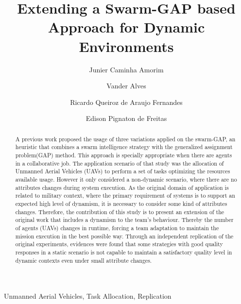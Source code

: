 \documentclass[review]{elsarticle}
\newcommand{\uavs}{UAVs}
\begin{document}
\begin{frontmatter}
	
\title{Extending a Swarm-GAP based Approach for Dynamic Environments}

\author[unbaddress]{Junier Caminha Amorim}

\author[unbaddress]{Vander Alves}

\author[brazilianarmyaddress]{Ricardo Queiroz de Araujo Fernandes}

\author[ufrgsaddress]{Edison Pignaton de Freitas}

\address[unbaddress]{Computation Science Department University of Brasilia, Brazil}
\address[ufrgsaddress]{Institute of Informatics Federal University of Rio Grande do Sul, Brazil}
\address[brazilianarmyaddress]{Software Development Center - Brazilian Army, Brazil}

\begin{abstract}
A previous work proposed the usage of three variations applied on the swarm-GAP, an heuristic that combines a swarm intelligence strategy with the generalized assignment problem(GAP) method. This approach is specially appropriate when there are agents in a collaborative job. The application scenario of that study was the allocation of Unmanned Aerial Vehicles (\uavs) to perform a set of tasks optimizing the resources available usage. However it only considered a non-dynamic scenario, where there are no attributes changes during system execution. As the original domain of application is related to military context, where the primary requirement of systems is to support an expected high level of dynamism, it is necessary to consider some kind of attributes changes. Therefore, the contribution of this study is to present an extension of the original work that includes a dynamism to the team's behaviour. Thereby the number of agents (\uavs) changes in runtime, forcing a team adaptation to maintain the mission execution in the best possible way. Through an independent replication of the original experiments, evidences were found that some strategies with good quality responses in a static scenario is not capable to maintain a satisfactory quality level in dynamic contexts even under small attribute changes. 
\end{abstract}

\begin{keyword}
Unmanned Aerial Vehicles, Task Allocation, Replication
\end{keyword}

\end{frontmatter}
\end{document}

